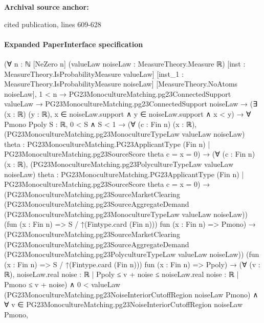\documentclass[10pt]{article}
\begin{document}
\textbf{Archival source anchor:} {\footnotesize\raggedright cited publication, lines 609-\allowbreak{}628\par}
\paragraph{Expanded PaperInterface specification}
\begin{ReviewVerbatim}
(∀ {n : ℕ} [NeZero n] (valueLaw noiseLaw : MeasureTheory.Measure ℝ) [inst : MeasureTheory.IsProbabilityMeasure valueLaw]
    [inst_1 : MeasureTheory.IsProbabilityMeasure noiseLaw] [MeasureTheory.NoAtoms noiseLaw],
    1 < n →
      PG23MonocultureMatching.pg23ConnectedSupport valueLaw →
        PG23MonocultureMatching.pg23ConnectedSupport noiseLaw →
          (∃ (x : ℝ) (y : ℝ), x ∈ noiseLaw.support ∧ y ∈ noiseLaw.support ∧ x < y) →
            ∀ {Pmono Ppoly S : ℝ},
              0 < S ∧ S < 1 →
                (∀ (c : Fin n) (x : ℝ),
                    (PG23MonocultureMatching.pg23MonocultureTypeLaw valueLaw noiseLaw)
                        {theta : PG23MonocultureMatching.PG23ApplicantType (Fin n) |
                          PG23MonocultureMatching.pg23SourceScore theta c = x} =
                      0) →
                  (∀ (c : Fin n) (x : ℝ),
                      (PG23MonocultureMatching.pg23PolycultureTypeLaw valueLaw noiseLaw)
                          {theta : PG23MonocultureMatching.PG23ApplicantType (Fin n) |
                            PG23MonocultureMatching.pg23SourceScore theta c = x} =
                        0) →
                    (PG23MonocultureMatching.pg23SourceMarketClearing
                        (PG23MonocultureMatching.pg23SourceAggregateDemand
                          (PG23MonocultureMatching.pg23MonocultureTypeLaw valueLaw noiseLaw))
                        (fun (x : Fin n) => S / ↑(Fintype.card (Fin n))) fun (x : Fin n) => Pmono) →
                      (PG23MonocultureMatching.pg23SourceMarketClearing
                          (PG23MonocultureMatching.pg23SourceAggregateDemand
                            (PG23MonocultureMatching.pg23PolycultureTypeLaw valueLaw noiseLaw))
                          (fun (x : Fin n) => S / ↑(Fintype.card (Fin n))) fun (x : Fin n) => Ppoly) →
                        (∀ (v : ℝ),
                            noiseLaw.real {noise : ℝ | Ppoly ≤ v + noise} ≤
                              noiseLaw.real {noise : ℝ | Pmono ≤ v + noise}) ∧
                          0 < valueLaw (PG23MonocultureMatching.pg23NoiseInteriorCutoffRegion noiseLaw Pmono) ∧
                            ∀ v ∈ PG23MonocultureMatching.pg23NoiseInteriorCutoffRegion noiseLaw Pmono,

\end{ReviewVerbatim}
\end{document}
